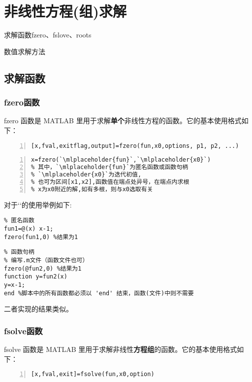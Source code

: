 \chapter{非线性方程(组)求解}
\begin{introduction}
\item 求解函数fzero、fslove、roots
\item 数值求解方法
\end{introduction}
\section{求解函数}\label{func}
\subsection{fzero函数}
fzero 函数是 MATLAB 里用于求解\textcolor{third}{\textbf{单个}}非线性方程的函数。它的基本使用格式如下：
\begin{lstlisting}[frame=single,numbers=left]
% 完整形式
[x,fval,exitflag,output]=fzero(fun,x0,options, p1, p2, ...)
\end{lstlisting}

\begin{lstlisting}[frame=single,numbers=left]
% 常用形式
x=fzero(`\mlplaceholder{fun}`,`\mlplaceholder{x0}`)
% 其中，`\mlplaceholder{fun}`为匿名函数或函数句柄
% `\mlplaceholder{x0}`为迭代初值,
% 也可为区间[x1,x2],函数值在端点处异号，在端点内求根
% x为x0附近的解,如有多根，则与x0选取有关
\end{lstlisting}

对于``的使用举例如下:

\begin{lstlisting}
% 匿名函数
fun1=@(x) x-1;
fzero(fun1,0) %结果为1
\end{lstlisting}

\begin{lstlisting}
% 函数句柄
% 编写.m文件（函数文件也可）
fzero(@fun2,0) %结果为1
function y=fun2(x)
y=x-1;
end %脚本中的所有函数都必须以 'end' 结束，函数(文件)中则不需要
\end{lstlisting}

二者实现的结果类似。

\newpage
\subsection{fsolve函数}
fsolve 函数是 MATLAB 里用于求解非线性\textcolor{third}{\textbf{方程组}}的函数。它的基本使用格式如下：
\begin{lstlisting}[frame=single,numbers=left]
% 完整形式
[x,fval,exit]=fsolve(fun,x0,option)
\end{lstlisting}


